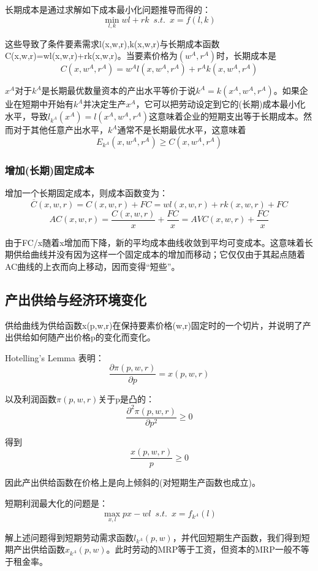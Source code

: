 \documentclass{article}
\begin{document}
长期成本是通过求解如下成本最小化问题推导而得的：
\[
\min\limits_{l,k} wl+rk\enspace s.t.\enspace x=f(l,k)
\]

这些导致了条件要素需求l(x,w,r),k(x,w,r)与长期成本函数C(x,w,r)=wl(x,w,r)+rk(x,w,r)。当要素价格为$ (w^A,r^A) $时，长期成本是
\[
C(x,w^A,r^A)=w^Al(x,w^A,r^A)+r^Ak(x,w^A,r^A)
\]

$ x^A $对于$ k^A $是长期最优数量资本的产出水平等价于说$ k^A=k(x^A,w^A,r^A) $。如果企业在短期中开始有$ k^A $并决定生产$ x^A $，它可以把劳动设定到它的(长期)成本最小化水平，导致$ l_{k^A}(x^A)=l(x^A,w^A,r^A) $这意味着企业的短期支出等于长期成本。然而对于其他任意产出水平，$ k^A $通常不是长期最优水平，这意味着
\[
E_{k^A}(x,w^A,r^A)\ge C(x,w^A,r^A)
\]

\subsubsection{增加(长期)固定成本}

增加一个长期固定成本，则成本函数变为：
\[
\overline{C}(x,w,r)=C(x,w,r)+FC=wl(x,w,r)+rk(x,w,r)+FC
\]
\[
AC(x,w,r)=\frac{C(x,w,r)}{x}+\frac{FC}{x}=AVC(x,w,r)+\frac{FC}{x}
\]

由于FC/x随着x增加而下降，新的平均成本曲线收敛到平均可变成本。这意味着长期供给曲线并没有因为这样一个固定成本的增加而移动；它仅仅由于其起点随着AC曲线的上衣而向上移动，因而变得“短些”。

\subsection{产出供给与经济环境变化}

供给曲线为供给函数x(p,w,r)在保持要素价格(w,r)固定时的一个切片，并说明了产出供给如何随产出价格p的变化而变化。

Hotelling's Lemma 表明：
\[
\frac{\partial \pi(p,w,r)}{\partial p}=x(p,w,r)
\]

以及利润函数$ \pi(p,w,r) $关于p是凸的：
\[
\frac{\partial^2\pi(p,w,r)}{\partial p^2}\ge0
\]

得到
\[
\frac{x(p,w,r)}{p}\ge0
\]

因此产出供给函数在价格上是向上倾斜的(对短期生产函数也成立)。

\hspace*{\fill}

短期利润最大化的问题是：
\[
\max\limits_{x,l} px-wl\enspace s.t.\enspace x=f_{k^A}(l)
\]

解上述问题得到短期劳动需求函数$ l_{k^A}(p,w) $，并代回短期生产函数，我们得到短期产出供给函数$ x_{k^A}(p,w) $。此时劳动的MRP等于工资，但资本的MRP一般不等于租金率。
\end{document}
